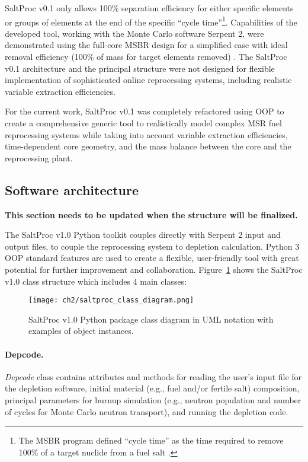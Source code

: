 SaltProc v0.1 only allows 100\% separation efficiency for either specific 
elements or groups of elements at the end of the specific ``cycle 
time''\footnote{The \gls{MSBR} program defined ``cycle time'' as the time 
required to remove 100\% of a target nuclide from a fuel salt  
\cite{robertson_conceptual_1971}.}. Capabilities of the developed tool, 
working with the Monte Carlo software Serpent 2, were demonstrated using the 
full-core MSBR design for a simplified case with ideal removal efficiency 
(100\% of mass for target elements removed) \cite{rykhlevskii_modeling_2019}. 
The SaltProc v0.1 architecture and the principal structure were not designed 
for flexible implementation of sophisticated online reprocessing systems, 
including realistic variable extraction efficiencies. 

For the current work, SaltProc v0.1 was completely refactored using \gls{OOP} 
to create a comprehensive generic tool to realistically model complex 
\gls{MSR} fuel reprocessing systems while taking into account variable 
extraction efficiencies, time-dependent core geometry, and the mass balance 
between the core and the reprocessing plant.

\subsection{Software architecture} \textbf{This section needs to be updated 
when the structure will be finalized.}

The SaltProc v1.0 Python toolkit couples directly with Serpent 2 input 
and output files, to couple the reprocessing system to depletion calculation. 
Python 3 \gls{OOP} standard features are used to create a flexible, 
user-friendly tool with great potential for further improvement and 
collaboration. Figure~\ref{fig:saltproc_class} shows the SaltProc v1.0 class 
structure which includes 4 main classes:
\begin{figure}[ht!] %
	\texttt{[image: ch2/saltproc\_class\_diagram.png]}
	\vspace{-0.15in}
	\caption{SaltProc v1.0 Python package class diagram in UML 
	notation with examples of object instances.}
	\label{fig:saltproc_class}
\end{figure}
\paragraph{Depcode.}\textit{Depcode} class contains attributes and methods for 
reading the user's input file for the depletion software, initial material 
(e.g., fuel and/or fertile salt) composition, principal parameters for burnup 
simulation (e.g., neutron population and number of cycles for Monte Carlo 
neutron transport), and running the depletion code.
